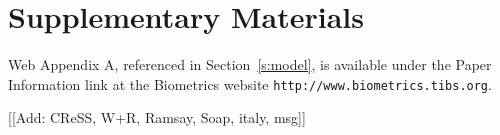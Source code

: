 \documentclass[useAMS,referee]{biom}
\begin{document}
\section*{Supplementary Materials}

Web Appendix A, referenced in Section~\ref{s:model}, is available 
under the Paper Information link at the Biometrics website
{\tt http://www.biometrics.tibs.org}.\vspace*{-8pt}



[[Add: CReSS, W+R, Ramsay, Soap, italy, msg]]
\end{document}
